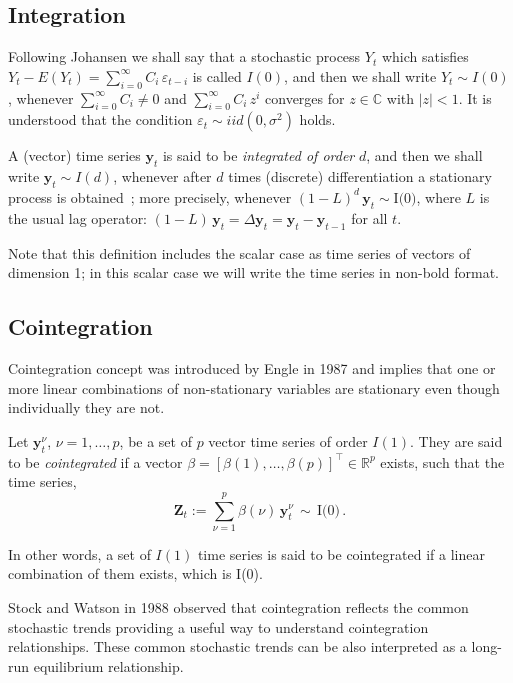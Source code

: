 \subsection{Integration}

Following Johansen \cite{johansen1995} we shall say that a stochastic process
$Y_t$ which satisfies $Y_t-E(Y_t) = \sum_{i=0}^\infty C_i\,\varepsilon_{t-i}$ is
called $I(0)$, and then we shall write $Y_t\sim I(0)$, whenever
$\sum_{i=0}^\infty C_i \neq 0$ and $\sum_{i=0}^\infty C_i\,z^i$ converges for
$z\in\mathbb{C}$ with $|z|<1$.  It is understood that the condition
$\varepsilon_t\sim iid(0,\sigma^2)$ holds.

A (vector) time series $\mathbf{y}_t$ is said to be {\em integrated of order\/}
$d$, and then we shall write $\mathbf{y}_t\sim I(d)$, whenever after $d$ times
(discrete) differentiation a stationary process is
obtained~\cite{banerjee1993};
more precisely, whenever
$(1-L)^d\,\mathbf{y}_t\sim\text{I(0)}$, where $L$ is the usual lag operator:
$(1-L)\,\mathbf{y}_t = \Delta\mathbf{y}_t = \mathbf{y}_t-\mathbf{y}_{t-1}$ for
all $t$.  

Note that this definition includes the scalar case as time series of
vectors of dimension 1; in this scalar case we will write the time series in
non-bold format.


\subsection{Cointegration} \label{sec:cointegration}
Cointegration concept was introduced by Engle in 1987 \cite{engle1987} and implies that one or
more linear combinations of non-stationary variables are stationary even though
individually they are not.  

Let $\mathbf{y}_t^\nu$, $\nu=1,\dots,p$, be a set of $p$ vector time series of
order $I(1)$.  They are said to be {\em cointegrated\/} if a vector
$\beta=[\beta(1),\dots,\beta(p)]^\top \in \mathbb{R}^p$ exists, such that the
time series,
\begin{equation}
\mathbf{Z}_t:= 
\sum_{\nu=1}^p \beta(\nu)\,\mathbf{y}_t^\nu\,\sim\,\text{I(0)}\,.
\end{equation}

In other words, a set of $I(1)$ time series is said to be cointegrated if a
linear combination of them exists, which is I(0).

Stock and Watson in 1988 \cite{stock+watson1988} observed that
cointegration reflects the common stochastic trends providing a useful way to
understand cointegration relationships. These common stochastic trends can be
also interpreted as a long-run equilibrium relationship.

